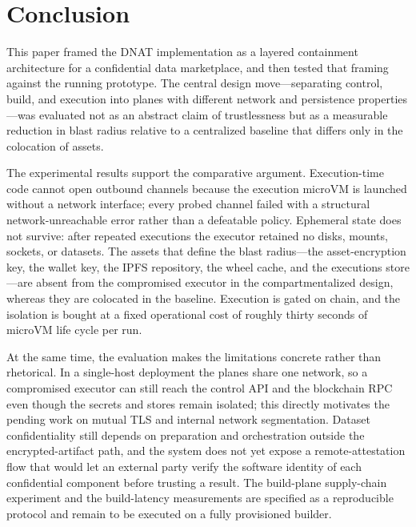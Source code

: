 
\section{Conclusion}
\label{sec:conclusion}

This paper framed the DNAT implementation as a layered containment architecture
for a confidential data marketplace, and then tested that framing against the
running prototype. The central design move---separating control, build, and
execution into planes with different network and persistence properties---was
evaluated not as an abstract claim of trustlessness but as a measurable reduction
in blast radius relative to a centralized baseline that differs only in the
colocation of assets.

The experimental results support the comparative argument. Execution-time code
cannot open outbound channels because the execution microVM is launched without a
network interface; every probed channel failed with a structural
network-unreachable error rather than a defeatable policy. Ephemeral state does
not survive: after repeated executions the executor retained no disks, mounts,
sockets, or datasets. The assets that define the blast radius---the
asset-encryption key, the wallet key, the IPFS repository, the wheel cache, and
the executions store---are absent from the compromised executor in the
compartmentalized design, whereas they are colocated in the baseline. Execution
is gated on chain, and the isolation is bought at a fixed operational cost of
roughly thirty seconds of microVM life cycle per run.

At the same time, the evaluation makes the limitations concrete rather than
rhetorical. In a single-host deployment the planes share one network, so a
compromised executor can still reach the control API and the blockchain RPC even
though the secrets and stores remain isolated; this directly motivates the
pending work on mutual TLS and internal network segmentation. Dataset
confidentiality still depends on preparation and orchestration outside the
encrypted-artifact path, and the system does not yet expose a remote-attestation
flow that would let an external party verify the software identity of each
confidential component before trusting a result. The build-plane supply-chain
experiment and the build-latency measurements are specified as a reproducible
protocol and remain to be executed on a fully provisioned builder.

